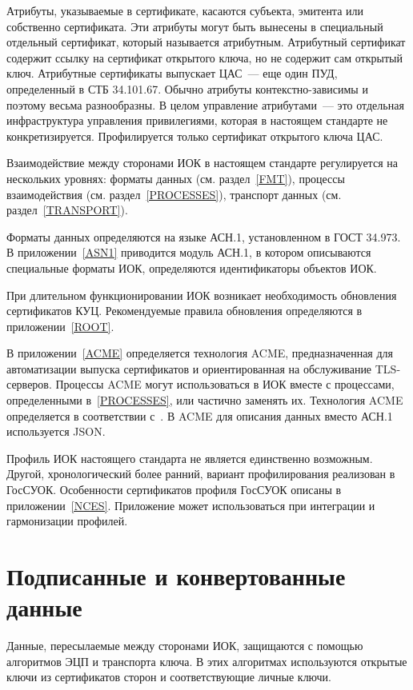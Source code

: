 Атрибуты, указываемые в сертификате, касаются субъекта, эмитента или собственно
сертификата. Эти атрибуты могут быть вынесены в специальный отдельный
сертификат, который называется атрибутным. Атрибутный  сертификат содержит
ссылку на сертификат открытого ключа, но не содержит сам открытый ключ.
%
Атрибутные сертификаты выпускает ЦАС~--- еще один ПУД, определенный в СТБ
34.101.67. Обычно атрибуты контекстно-зависимы и поэтому весьма разнообразны. В
целом управление атрибутами~---  это отдельная  инфраструктура управления
привилегиями, которая в настоящем стандарте не конкретизируется. Профилируется
только сертификат открытого ключа ЦАС.

Взаимодействие между сторонами ИОК в настоящем стандарте регулируется на
нескольких уровнях: форматы данных (см. раздел~\ref{FMT}), процессы
взаимодействия (см. раздел~\ref{PROCESSES}), транспорт данных
(см. раздел~\ref{TRANSPORT}).

Форматы данных определяются на языке АСН.1, установленном в ГОСТ 34.973. 
В приложении~\ref{ASN1} приводится модуль АСН.1, в котором описываются 
специальные форматы ИОК, определяются идентификаторы объектов ИОК.

При длительном функционировании ИОК возникает необходимость обновления 
сертификатов КУЦ. Рекомендуемые правила обновления определяются в 
приложении~\ref{ROOT}.

В приложении~\ref{ACME} определяется технология ACME, 
предназначенная для автоматизации выпуска сертификатов и ориентированная на 
обслуживание TLS-серверов.
%
Процессы ACME могут использоваться в ИОК вместе с процессами, определенными
в~\ref{PROCESSES}, или частично заменять их.
%
Технология ACME определяется в соответствии с~\cite{RFC8555}.
%
В ACME для описания данных вместо АСН.1 используется JSON.

Профиль ИОК настоящего стандарта не является единственно возможным. Другой,
хронологический более ранний, вариант профилирования реализован в ГосСУОК.
Особенности сертификатов профиля ГосСУОК описаны в приложении~\ref{NCES}.
Приложение может использоваться при интеграции и гармонизации профилей.

\section{Подписанные и конвертованные данные}\label{COMMON.CMS}

Данные, пересылаемые между сторонами ИОК, защищаются с помощью алгоритмов ЭЦП и
транспорта ключа. В этих алгоритмах используются открытые ключи из сертификатов
сторон и соответствующие личные ключи.

